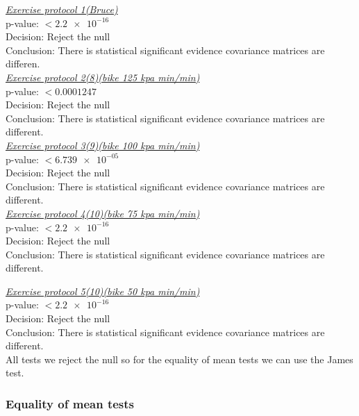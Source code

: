 \documentclass[a4paper]{article}
\begin{document}

\underline{\textit{Exercise protocol 1(Bruce)}}\\
p-value: $< \num{2.2e-16}$\\
Decision: Reject the null\\
Conclusion: There is statistical significant evidence covariance matrices 
are differen.\\


\underline{\textit{Exercise protocol 2(8)(bike 125 kpa min/min)}}\\
p-value: $< \num{0.0001247}$\\
Decision: Reject the null\\
Conclusion: There is statistical significant evidence covariance matrices 
are different.\\


\underline{\textit{Exercise protocol 3(9)(bike 100 kpa min/min)}}\\
p-value: $< \num{6.739e-05}$\\
Decision: Reject the null\\
Conclusion: There is statistical significant evidence covariance matrices 
are different.\\


\underline{\textit{Exercise protocol 4(10)(bike 75 kpa min/min)}}\\
p-value: $< \num{2.2e-16}$\\
Decision: Reject the null\\
Conclusion: There is statistical significant evidence covariance matrices 
are different.\\

\newpage  

\underline{\textit{Exercise protocol 5(10)(bike 50
kpa min/min)}}\\
p-value: $< \num{2.2e-16}$\\
Decision: Reject the null\\
Conclusion: There is statistical significant evidence covariance matrices 
are different.\\

All tests we reject the null so for the equality of mean tests we can use the James test.

\subsubsection{Equality of mean tests}
\end{document}
